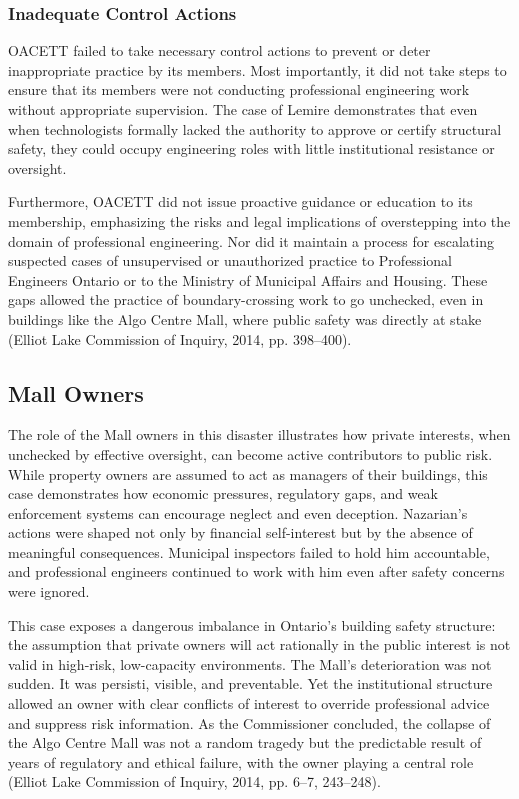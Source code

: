 \documentclass[12pt]{article}
\begin{document}
\subsubsection*{Inadequate Control Actions}
OACETT failed to take necessary control actions to prevent or deter inappropriate practice by its members. Most importantly, it did not take steps to ensure that its members were not conducting professional engineering work without appropriate supervision. The case of Lemire demonstrates that even when technologists formally lacked the authority to approve or certify structural safety, they could occupy engineering roles with little institutional resistance or oversight.

Furthermore, OACETT did not issue proactive guidance or education to its membership, emphasizing the risks and legal implications of overstepping into the domain of professional engineering. Nor did it maintain a process for escalating suspected cases of unsupervised or unauthorized practice to Professional Engineers Ontario or to the Ministry of Municipal Affairs and Housing. These gaps allowed the practice of boundary-crossing work to go unchecked, even in buildings like the Algo Centre Mall, where public safety was directly at stake (Elliot Lake Commission of Inquiry, 2014, pp. 398–400).

\subsection{Mall Owners}
The role of the Mall owners in this disaster illustrates how private interests, when unchecked by effective oversight, can become active contributors to public risk. While property owners are assumed to act as managers of their buildings, this case demonstrates how economic pressures, regulatory gaps, and weak enforcement systems can encourage neglect and even deception. Nazarian’s actions were shaped not only by financial self-interest but by the absence of meaningful consequences. Municipal inspectors failed to hold him accountable, and professional engineers continued to work with him even after safety concerns were ignored.

This case exposes a dangerous imbalance in Ontario’s building safety structure: the assumption that private owners will act rationally in the public interest is not valid in high-risk, low-capacity environments. The Mall’s deterioration was not sudden. It was persisti, visible, and preventable. Yet the institutional structure allowed an owner with clear conflicts of interest to override professional advice and suppress risk information. As the Commissioner concluded, the collapse of the Algo Centre Mall was not a random tragedy but the predictable result of years of regulatory and ethical failure, with the owner playing a central role (Elliot Lake Commission of Inquiry, 2014, pp. 6–7, 243–248).
\end{document}

